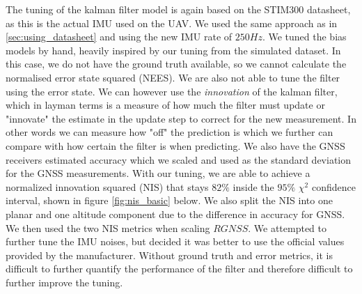 The tuning of the kalman filter model is again based on the STIM300 datasheet, as this is the actual IMU used on the UAV. We used the same approach as in \cref{sec:using_datasheet} and using the new IMU rate of $250Hz$. We tuned the bias models by hand, heavily inspired by our tuning from the simulated dataset. In this case, we do not have the ground truth available, so we cannot calculate the normalised error state squared (NEES). We are also not able to tune the filter using the error state. We can however use the \textit{innovation} of the kalman filter, which in layman terms is a measure of how much the filter must update or "innovate" the estimate in the update step to correct for the new measurement. In other words we can measure how "off" the prediction is which we further can compare with how certain the filter is when predicting. We also have the GNSS receivers estimated accuracy which we scaled and used as the standard deviation for the GNSS measurements. With our tuning, we are able to achieve a normalized innovation squared (NIS) that stays $82\%$ inside the $95\%$ $\chi^2$ confidence interval, shown in figure \ref{fig:nis_basic} below. We also split the NIS into one planar and one altitude component due to the difference in accuracy for GNSS. We then used the two NIS metrics when scaling $RGNSS$. We attempted to further tune the IMU noises, but decided it was better to use the official values provided by the manufacturer. Without ground truth and error metrics, it is difficult to further quantify the performance of the filter and therefore difficult to further improve the tuning. 

